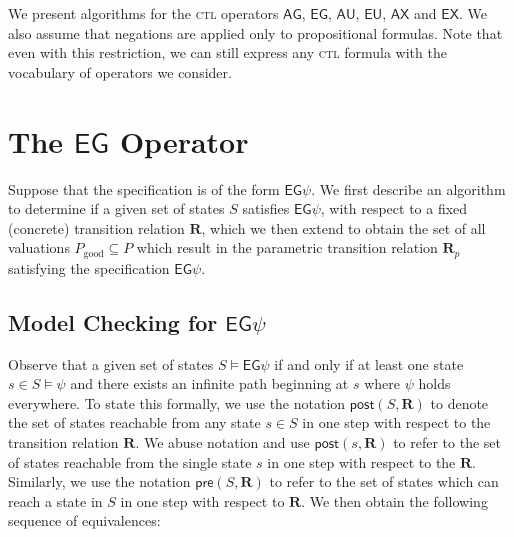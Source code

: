 \documentclass[10pt]{article}
\newcommand{\ctl}{\textsc{ctl}\xspace}
\newcommand{\ptrans}{\ensuremath{\mathbf{R}_p}\xspace}
\newcommand{\ctrans}{\ensuremath{\mathbf{R}}\xspace}
\newcommand{\ag}[1]{\ensuremath{\mathsf{AG}#1\xspace}}
\newcommand{\eg}[1]{\ensuremath{\mathsf{EG}#1\xspace}}
\newcommand{\ax}[1]{\ensuremath{\mathsf{AX}#1\xspace}}
\newcommand{\ex}[1]{\ensuremath{\mathsf{EX}#1\xspace}}
\newcommand{\au}[2]{\ensuremath{\mathsf{A}#1 \mathsf{U} #2\xspace}}
\newcommand{\eu}[2]{\ensuremath{\mathsf{E}#1 \mathsf{U} #2\xspace}}
\newcommand{\pgood}{\ensuremath{P_{\mathrm{good}}}\xspace}
\newcommand{\post}[2]{\ensuremath{\mathsf{post}(#1, #2)}\xspace}
\newcommand{\pre}[2]{\ensuremath{\mathsf{pre}(#1, #2)}\xspace}
\begin{document}
\begin{spacing}{1}
We present algorithms for the \ctl operators \ag{}, \eg{}, \au{}{},
\eu{}{}, \ax{} and \ex{}. We also assume that negations are applied only to
propositional formulas. Note that even with this restriction, we can still
express any \ctl formula with the vocabulary of operators we consider.

\section{The \eg{} Operator}
Suppose that the specification is of the form \eg{\psi}. We first describe
an algorithm to determine if a given set of states $S$ satisfies
\eg{\psi}, with respect to a fixed (concrete) transition relation
$\ctrans$, which we then extend to obtain the set of all valuations $\pgood
\subseteq P$ which result in the parametric transition relation $\ptrans$
satisfying the specification $\eg{\psi}$.

\subsection{Model Checking for $\eg{\psi}$}
Observe that a given set of states $S \models \eg{\psi}$ if and only if at
least one state $s \in S \models \psi$ and there exists an infinite path
beginning at $s$ where $\psi$ holds everywhere. To state this formally, we
use the notation $\post{S}{\ctrans}$ to denote the set of states reachable
from any state $s \in S$ in one step with respect to the transition
relation \ctrans. We abuse notation and use $\post{s}{\ctrans}$ to refer to
the set of states reachable from the single state $s$ in one step with
respect to the \ctrans. Similarly, we use the notation $\pre{S}{\ctrans}$
to refer to the set of states which can reach a state in $S$ in one step
with respect to $\ctrans$. We then obtain the following sequence of
equivalences:


\end{spacing}
\end{document}
